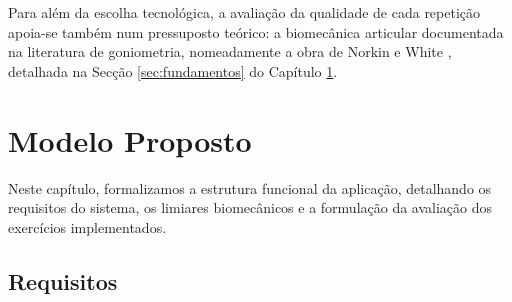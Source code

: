 Para além da escolha tecnológica, a avaliação da qualidade de cada repetição apoia-se também num pressuposto teórico: a biomecânica articular documentada na literatura de goniometria, nomeadamente a obra de Norkin e White \cite{Norkin_White_2016}, detalhada na Secção \ref{sec:fundamentos} do Capítulo \ref{ch:modeloProposto}.


\chapter{Modelo Proposto}
\label{ch:modeloProposto}

Neste capítulo, formalizamos a estrutura funcional da aplicação, detalhando os requisitos do sistema, os limiares biomecânicos e a formulação da avaliação dos exercícios implementados.

\section{Requisitos}
\label{sec:requisitos}

